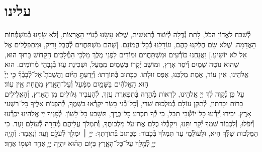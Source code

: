 \documentclass[twoside, openany, parskip=half, 11pt]{book}
\begin{document}
\uvaletzion

\\
\\


\label{end of shacharis}
\fullkaddish

\section*{ עלינו }

\newcommand{\aleinu}{
\firstword{עָלֵֽינוּ}
לְ֯שַׁבֵּחַ לַאֲדוֹן הַכֹּל, לָתֵת גְּ֯דֻלָּה לְ֯יוֹצֵר בְּ֯רֵאשִׁית, שֶׁלֹּא עָשָׂנוּ כְּ֯גוֹיֵי הָאֲרָצוֹת, וְ֯לֹא שָׂמָנוּ כְּ֯מִשְׁפְּ֯חוֹת הָאֲדָמָה. שֶׁלֹּא שָׂם חֶלְקֵנוּ כָּהֶם, וגוֹרָלֵנוּ כְּ֯כׇל־הֲמוֹנָם. [שֶׁהֵם מִשְׁתַּחֲוִים לְ֯הֶבֶל וָרִיק, וּמִתְפַּלֲּלִים אֶל אֵל לֹא יוֹשִׁיעַ.] וַאֲנַחְנוּ כּוֹרְ֯עִים וּמִשְׁתַּחֲוִים וּמוֹדִים לִפְנֵי מֶלֶךְ מַלְכֵי הַמְּ֯לָכִים הַקָּדוֹשׁ בָּרוּךְ הוּא, שֶׁהוּא נוֹטֶה שָׁמַיִם וְ֯יֹסֵד אָרֶץ, וּמוֹשַׁב יְ֯קָרוֹ בַּשָּׁמַיִם מִמַּעַל, וּשְׁכִינַת עֻזּוֹ בְּ֯גׇבְהֵי מְ֯רוֹמִים. הוּא אֱלֹהֵינוּ, אֵין עוֹד, אֱמֶת מַלְכֵּנוּ, אֶפֶס זוּלָתוֹ. כַּכָּתוּב בְּ֯תּוֹרָתוֹ: וְ֯יָדַעְתָּ֣
\source{דברים ד}
הַיּ֗וֹם וַהֲשֵׁבֹתָ֮ אֶל־לְ֯בָבֶ֒ךָ֒ כִּ֤י יְיָ֙ ה֣וּא הָֽאֱלֹהִ֔ים בַּשָּׁמַ֣יִם מִמַּ֔עַל וְ֯עַל־הָאָ֖רֶץ מִתָּ֑חַת אֵ֖ין עֽוֹד׃\\
עַל כֵּן נְ֯קַוֶּה לְ֯ךָ יְיָ אֱלֹהֵינוּ, לִרְאוֹת מְ֯הֵרָה בְּ֯תִפְאֶרֶת עֻזֶּךָ, לְ֯הַעֲבִיר גִּלּוּלִים מִן הָאָרֶץ, וְ֯הָאֱלִילִים כָּרוֹת יִכָּרֵתוּן, לְ֯תַקֵּן עוֹלָם בְּ֯מַלְכוּת שַׁדַּי, וְ֯כׇל־בְּ֯נֵי בָשָׂר יִקְרְ֯אוּ בִשְׁמֶךָ, לְ֯הַפְנוֹת אֵלֶיךָ כׇּל־רִשְׁעֵי אָרֶץ. יַכִּירוּ וְ֯יֵדְ֯עוּ כׇּל־יוֹשְׁ֯בֵי תֵבֵל, כִּי לְ֯ךָ תִכְרַע כׇּל־בֶּרֶךְ, תִּשָּׁבַע כׇּל־לָשׁוֹן. לְ֯פָנֶיךָ יְיָ אֱלֹהֵינוּ יִכְרְ֯עוּ וְ֯יִפֹּלוּ, וְ֯לִכְבוֹד שִׁמְךָ יְ֯קָר יִתֵּנוּ, \adforn{14} וִיקַבְּ֯לוּ כֻלָּם אֶת־עֹל מַלְכוּתֶךָ, וְ֯תִמְלֹךְ עֲלֵיהֶם מְ֯הֵרָה לְ֯עוֹלָם וָעֶד. כִּי הַמַּלְכוּת שֶׁלְּ֯ךָ הִיא, וּלְעוֹלְ֯מֵי עַד תִּמְלֹךְ בְּ֯כָבוֹד: כַּכָּתוּב בְּ֯תוֹרָתֶךָ:\source{שמות טו} יְיָ֥ ׀ יִמְלֹ֖ךְ לְ֯עֹלָ֥ם וָעֶֽד׃ וְ֯נֶאֱמַר:\source{זכריה יד} וְ֯הָיָ֧ה יְיָ֛ לְ֯מֶ֖לֶךְ עַל־כׇּל־הָאָ֑רֶץ בַּיּ֣וֹם הַה֗וּא יִהְיֶ֧ה יְיָ֛ אֶחָ֖ד וּשְׁמ֥וֹ אֶחָֽד׃
}

\aleinu
\end{document}
